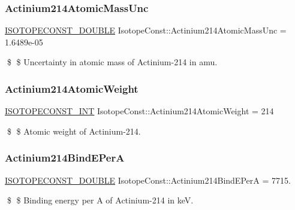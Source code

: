 \subsubsection{\texorpdfstring{Actinium214\+Atomic\+Mass\+Unc}{Actinium214AtomicMassUnc}}
{\footnotesize\ttfamily \mbox{\hyperlink{group___isotope_const-_macros_ga8f45a7272ce02c0b4c65c44636ed719a}{I\+S\+O\+T\+O\+P\+E\+C\+O\+N\+S\+T\+\_\+\+D\+O\+U\+B\+LE}} Isotope\+Const\+::\+Actinium214\+Atomic\+Mass\+Unc = 1.\+6489e-\/05}

\$ \$ Uncertainty in atomic mass of Actinium-\/214 in amu. \mbox{\label{group___isotope_const-_actinium-_ac214_gaf3fc9eecaf5618e41650ac9878c97854}} 
\subsubsection{\texorpdfstring{Actinium214\+Atomic\+Weight}{Actinium214AtomicWeight}}
{\footnotesize\ttfamily \mbox{\hyperlink{group___isotope_const-_macros_ga5f18360b3e99483a35c32d789e62621c}{I\+S\+O\+T\+O\+P\+E\+C\+O\+N\+S\+T\+\_\+\+I\+NT}} Isotope\+Const\+::\+Actinium214\+Atomic\+Weight = 214}

\$ \$ Atomic weight of Actinium-\/214. \mbox{\label{group___isotope_const-_actinium-_ac214_ga9649180691ce6a910f97621222013324}} 
\subsubsection{\texorpdfstring{Actinium214\+Bind\+E\+PerA}{Actinium214BindEPerA}}
{\footnotesize\ttfamily \mbox{\hyperlink{group___isotope_const-_macros_ga8f45a7272ce02c0b4c65c44636ed719a}{I\+S\+O\+T\+O\+P\+E\+C\+O\+N\+S\+T\+\_\+\+D\+O\+U\+B\+LE}} Isotope\+Const\+::\+Actinium214\+Bind\+E\+PerA = 7715.}

\$ \$ Binding energy per A of Actinium-\/214 in keV. \mbox{\label{group___isotope_const-_actinium-_ac214_ga99b27a4fff6cf8dd88a53a0eea346e49}} 
